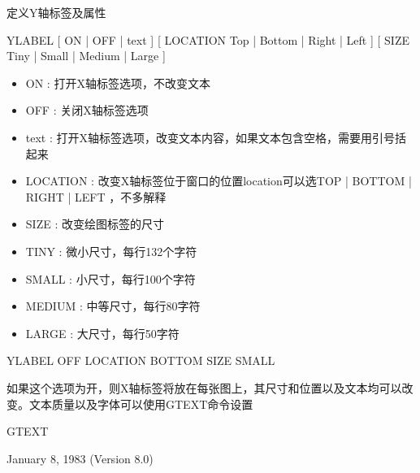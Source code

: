 \label{cmd:ylabel}

定义Y轴标签及属性

YLABEL [ ON | OFF | text ] [ LOCATION Top | Bottom | Right | Left ] [ SIZE Tiny | Small | Medium | Large ]

\begin{itemize}
\item ON : 打开X轴标签选项，不改变文本 
\item OFF : 关闭X轴标签选项 
\item text : 打开X轴标签选项，改变文本内容，如果文本包含空格，需要用引号括起来
\item LOCATION : 改变X轴标签位于窗口的位置location可以选TOP | BOTTOM | RIGHT | LEFT ，不多解释
\item SIZE :  改变绘图标签的尺寸 
\item TINY : 微小尺寸，每行132个字符
\item SMALL :  小尺寸，每行100个字符 
\item MEDIUM : 中等尺寸，每行80字符 
\item LARGE : 大尺寸，每行50字符 
\end{itemize}

YLABEL OFF LOCATION BOTTOM SIZE SMALL

如果这个选项为开，则X轴标签将放在每张图上，其尺寸和位置以及文本均可以改变。文本质量以及字体可以使用GTEXT命令设置

GTEXT

January 8, 1983 (Version 8.0)
